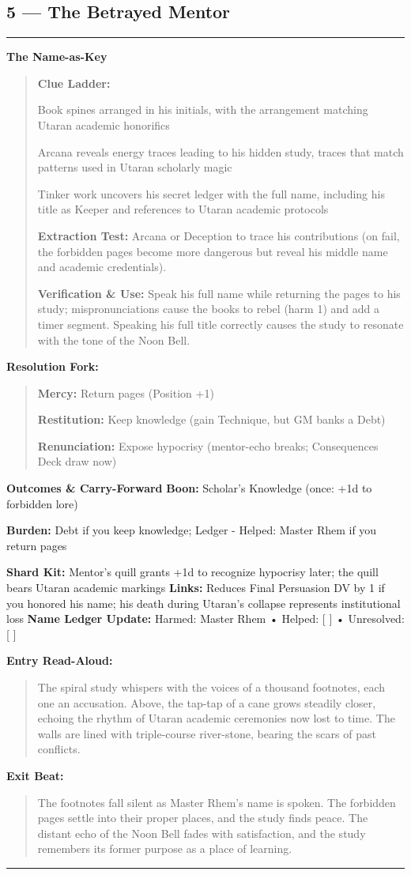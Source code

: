 \documentclass[18pt, letterpaper, twoside]{article}
\newenvironment{floorbox}[1]{%
    \begin{center}
    \begin{minipage}{0.95\textwidth}
    \subsection*{#1}
    \vspace{-0.5em}
    \rule{\textwidth}{0.5pt}
    \vspace{0.5em}
}{%
    \vspace{0.5em}
    \rule{\textwidth}{0.5pt}
    \end{minipage}
    \end{center}
}
\newenvironment{gmnote}[1]{%
    \vspace{0.5em}
    \noindent\textbf{#1}
    \begin{quote}
}{%
    \end{quote}
    \vspace{0.5em}
}
\newenvironment{resolutionbox}{%
    \vspace{0.5em}
    \noindent\textbf{Resolution Fork:}
    \begin{quote}
}{%
    \end{quote}
    \vspace{0.5em}
}
\newenvironment{boxedtext}[1]{%
    \vspace{0.5em}
    \noindent\textbf{#1}
    \begin{quote}
}{%
    \end{quote}
    \vspace{0.5em}
}
\newcommand{\boon}[1]{\noindent\textbf{Boon:} #1\par}
\newcommand{\burden}[1]{\noindent\textbf{Burden:} #1\par}
\newcommand{\entrytext}[1]{\begin{boxedtext}{Entry Read-Aloud:} #1 \end{boxedtext}}
\newcommand{\exittext}[1]{\begin{boxedtext}{Exit Beat:} #1 \end{boxedtext}}
\begin{document}
\begin{floorbox}{5 --- The Betrayed Mentor}
\begin{gmnote}{The Name-as-Key}
\textbf{Clue Ladder:}
\begin{description}[leftmargin=*, style=unboxed]
    \item[Gentle Nudge:] Book spines arranged in his initials, with the arrangement matching Utaran academic honorifics
    \item[Actionable Lead:] Arcana reveals energy traces leading to his hidden study, traces that match patterns used in Utaran scholarly magic
    \item[Aha! Proof:] Tinker work uncovers his secret ledger with the full name, including his title as Keeper and references to Utaran academic protocols
\end{description}

\textbf{Extraction Test:} Arcana or Deception to trace his contributions (on fail, the forbidden pages become more dangerous but reveal his middle name and academic credentials).

\textbf{Verification \& Use:} Speak his full name while returning the pages to his study; mispronunciations cause the books to rebel (harm 1) and add a timer segment. Speaking his full title correctly causes the study to resonate with the tone of the Noon Bell.
\end{gmnote}

\begin{resolutionbox}
\textbf{Mercy:} Return pages (Position +1)

\textbf{Restitution:} Keep knowledge (gain Technique, but GM banks a Debt)

\textbf{Renunciation:} Expose hypocrisy (mentor-echo breaks; Consequences Deck draw now)
\end{resolutionbox}

\textbf{Outcomes \& Carry-Forward}
\boon{Scholar's Knowledge (once: +1d to forbidden lore)}
\burden{Debt if you keep knowledge; Ledger - Helped: Master Rhem if you return pages}
\textbf{Shard Kit:} Mentor's quill grants +1d to recognize hypocrisy later; the quill bears Utaran academic markings
\textbf{Links:} Reduces Final Persuasion DV by 1 if you honored his name; his death during Utaran's collapse represents institutional loss
\textbf{Name Ledger Update:} Harmed: Master Rhem • Helped: [ ] • Unresolved: [ ]

\entrytext{The spiral study whispers with the voices of a thousand footnotes, each one an accusation. Above, the tap-tap of a cane grows steadily closer, echoing the rhythm of Utaran academic ceremonies now lost to time. The walls are lined with triple-course river-stone, bearing the scars of past conflicts.}

\exittext{The footnotes fall silent as Master Rhem's name is spoken. The forbidden pages settle into their proper places, and the study finds peace. The distant echo of the Noon Bell fades with satisfaction, and the study remembers its former purpose as a place of learning.}
\end{floorbox}
\end{document}
